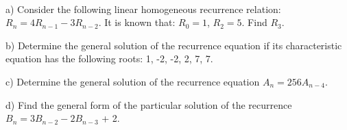 \documentclass[11pt]{article}
\begin{document}
	

\medskip


\lineacross

\begin{problem} \\
	\noindent a) Consider the following linear homogeneous recurrence relation: $R_n = 4R_{n-1} - 3R_{n-2}$. It is known that: $R_0 = 1$, $R_2 = 5$. Find $R_3$.

	\vspace {0.1in}
	\noindent b) Determine the general solution of the recurrence  equation if its characteristic equation has the following roots:  1, -2, -2, 2, 7, 7.

	\vspace {0.1in}
	\noindent  c) Determine the general solution of the recurrence  equation $A_n = 256A_{n-4}$.

	\vspace {0.1in}
	\noindent  d) Find the general form of the particular solution of the recurrence $B_n = 3B_{n-2} - 2B_{n-3}$ + 2.

\end{problem}
\end{document}
